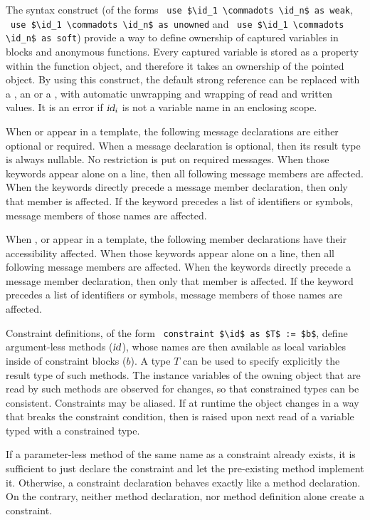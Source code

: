 The  syntax construct (of the forms ~\lstinline{use $\id_1 \commadots \id_n$ as weak}, ~\lstinline{use $\id_1 \commadots \id_n$ as unowned} and ~\lstinline{use $\id_1 \commadots \id_n$ as soft}) provide a way to define ownership of captured variables in blocks and anonymous functions. Every captured variable is stored as a property within the function object, and therefore it takes an ownership of the pointed object. By using this construct, the default strong reference can be replaced with a , an  or a , with automatic unwrapping and wrapping of read and written values. It is an error if $\mbox{\sl id}_i$ is not a variable name in an enclosing scope. 

When  or  appear in a template, the following message declarations are either optional or required. When a message declaration is optional, then its result type is always nullable. No restriction is put on required messages. When those keywords appear alone on a line, then all following message members are affected. When the keywords directly precede a message member declaration, then only that member is affected. If the keyword precedes a list of identifiers or symbols, message members of those names are affected. 

When ,  or  appear in a template, the following member declarations have their accessibility affected. When those keywords appear alone on a line, then all following message members are affected. When the keywords directly precede a message member declaration, then only that member is affected. If the keyword precedes a list of identifiers or symbols, message members of those names are affected. 

Constraint definitions, of the form ~\lstinline!constraint $\id$ as $T$ := $b$!, define argument-less methods ($\mbox{\sl id}$), whose names are then available as local variables inside of constraint blocks ($b$). A type $T$ can be used to specify explicitly the result type of such methods. The instance variables of the owning object that are read by such methods are observed for changes, so that constrained types can be consistent. Constraints may be aliased. If at runtime the object changes in a way that breaks the constraint condition, then  is raised upon next read of a variable typed with a constrained type. 

If a parameter-less method of the same name as a constraint already exists, it is sufficient to just declare the constraint and let the pre-existing method implement it. Otherwise, a constraint declaration behaves exactly like a method declaration. On the contrary, neither method declaration, nor method definition alone create a constraint. 

